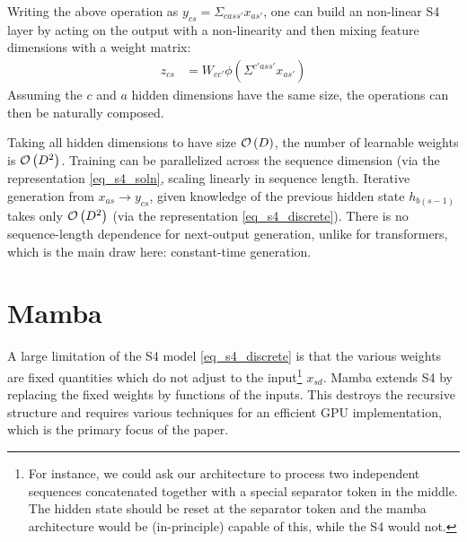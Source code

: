 Writing the above operation as $ y _{cs }   = \Sigma _{ca s s' } x _{ as' } $, one can build an
non-linear S4 layer by acting on the output with a non-linearity and then mixing feature dimensions
with a weight matrix:
\begin{align}
     z  _{ cs }  &= W _{ c c' } \phi \left ( \Sigma ^{c'a s s' } x _{ as' } \right ) \label{eq_s4_layer}
\end{align}
Assuming the $ c  $ and $ a  $ hidden dimensions have the same size, the operations can then be
naturally composed.

Taking all hidden dimensions to have size $ \mathcal{O} \left( D \right)  $, the number of learnable
weights is $ \mathcal{O} \left( D ^{ 2 }  \right)  $. Training can be parallelized across the sequence
dimension (via the representation \eqref{eq_s4_soln}, scaling linearly in sequence length. Iterative
generation from $ x _{ as } \longrightarrow y _{ cs }  $, given knowledge of the previous hidden
state $ h _{ b (s-1) }  $ takes only $ \mathcal{O} \left( D ^{ 2 } \right)  $ (via the representation
\eqref{eq_s4_discrete}). There is no sequence-length dependence for next-output generation, unlike
for transformers, which is the main draw here: constant-time generation.

\section{Mamba\label{sec_mamba}}

A large limitation of the S4 model \eqref{eq_s4_discrete} is that the various weights are fixed
quantities which do not adjust to the input\footnote{For instance, we could ask our architecture to
    process two independent sequences concatenated together with a special separator token in the
    middle. The hidden state should be reset at the separator token and the mamba architecture would
be (in-principle) capable of this, while the S4 would not.} $ x _{ sd }  $. Mamba \cite{mamba}
extends S4 by replacing the fixed weights by functions of the inputs. This destroys the recursive
structure and requires various techniques for an efficient GPU implementation, which is the primary
focus of the paper.

